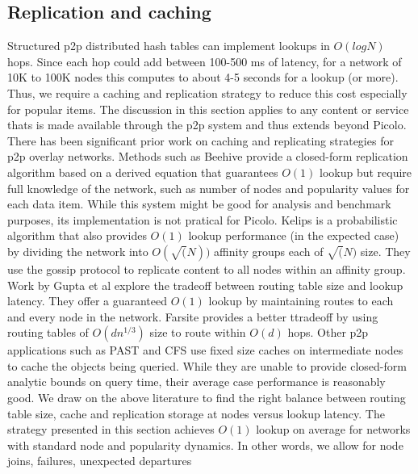 \subsection{Replication and caching}
\label{net:replication}
Structured p2p distributed hash tables can implement lookups in \( O(log N)\) hops. Since each hop could add between 100-500
ms of latency, for a network of 10K to 100K nodes this computes to about 4-5 seconds for a lookup (or more). Thus, we
require a caching and replication strategy to reduce this cost especially for popular items. The discussion in this
section applies to any content or service thats is made available through the p2p system and thus extends beyond \textsf{Picolo}.
\newline\newline
There has been significant prior work on caching and replicating strategies for p2p overlay networks. Methods such
as Beehive \cite{beehive} provide a closed-form replication algorithm based on a derived equation that guarantees
\(O(1)\) lookup but require full knowledge of the network, such as number of nodes and popularity values for each data
item. While this system might be good for analysis and benchmark purposes, its implementation is not pratical for
\textsf{Picolo}. Kelips \cite{kelips} is a probabilistic algorithm that also provides \(O(1)\) lookup performance (in the
expected case) by dividing the network into \(O(\sqrt(N))\) affinity groups each of \(\sqrt(N)\) size. They use the
gossip protocol to replicate content to all nodes within an affinity group. Work by Gupta et al \cite{one_hop_lookup}
explore the tradeoff between routing table size and lookup latency. They offer a guaranteed \(O(1)\) lookup by
maintaining routes to each and every node in the network. Farsite \cite{farsite} provides a better ttradeoff by using
routing tables of \(O(dn^{1/3})\) size to route within \(O(d)\) hops. Other p2p applications such as PAST \cite{past} and CFS \cite{cfs} use fixed size caches on intermediate nodes to
cache the objects being queried. While they are unable to provide closed-form analytic bounds on query time, their
average case performance is reasonably good.
\newline\newline
We draw on the above literature to find the right balance between routing table size, cache and replication storage at
nodes versus lookup latency. The strategy presented in this section achieves \(O(1)\) lookup on average for networks
with standard node and popularity dynamics. In other words, we allow for node joins, failures, unexpected departures
